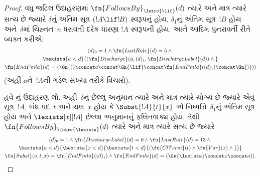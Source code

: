\begin{proof}
  વધુ જટિલ ઉદાહરણમાં
  $\fn{FollowsBy}_{\Intro{\lif}}(d)$
  ત્યારે અને માત્ર ત્યારે સત્ય છે જ્યારે
  $\delta$નું અંતિમ સૂત્ર
  $(!A \lif !B)$ સ્વરૂપનું હોય,
  $\delta_1$નું અંતિમ સૂત્ર~$!B$
  હોય અને~$\delta$માં ચિહ્નન~$n$
  ધરાવતી દરેક ધારણા $!A$ સ્વરૂપની હોય.
  આને આદિમ પુનરાવર્તી રીતે વ્યક્ત કરીએ:
  \begin{multline*}
    (d)_0 = 1 \land \fn{LastRule}(d) = 5 \land {}\\
    \bexists{a<d}{(\fn{Discharge}(a, (d)_1, \fn{DischargeLabel}(d)) \land {}}\\
      \fn{EndFmla}(d) = (\Gn{(} \concat a \concat \Gn{\lif}
      \concat \fn{EndFmla}((d)_1) \concat \Gn{)}))
  \end{multline*}
  (અહીં $a$ને~$!A$ની ગડેલ-સંખ્યા
  તરીકે વિચારો).

  હવે \Intro{\lexists}નું ઉદાહરણ લો.
  અહીં~$\delta$નું છેલ્લું અનુમાન
  ત્યારે અને માત્ર ત્યારે યોગ્ય છે
  જ્યારે એવું સૂત્ર~$!A$,
  બંધ પદ~$t$ અને ચલ~$x$
  હોય કે $\Subst{!A}{t}{x}$ એ
  નિષ્પત્તિ~$\delta_1$નું અંતિમ
  સૂત્ર હોય અને
  $\lexists[x][!A]$ છેલ્લા અનુમાનનું
  ફલિતવાક્ય હોય. તેથી
  $\fn{FollowsBy}_{\Intro{\lexists}}(d)$
  ત્યારે અને માત્ર ત્યારે સત્ય છે જ્યારે
  \begin{multline*}
    (d)_0 = 1 \land \fn{DischargeLabel}(d) = 0 \land
    \fn{LastRule}(d) = 13 \land {} \\
    \bexists{a < d}{\bexists{x<d}{\bexists{t<d}{
          (\fn{ClTerm}(t) \land \fn{Var}(x)  \land {}}}}\\
    \fn{Subst}(a,t,x) = \fn{EndFmla}((d)_1) \land
    \fn{EndFmla}(d) = (\Gn{\lexists} \concat x \concat a)).
  \end{multline*}


\end{proof}
